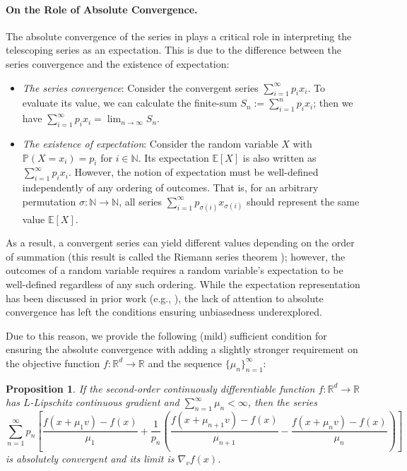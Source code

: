 \documentclass{article}
\newcommand{\EE}{\mathbb{E}}
\newcommand{\PP}{\mathbb{P}}
\newcommand{\RR}{\mathbb{R}}
\newcommand{\NN}{\mathbb{N}}
\theoremstyle{definition}
\theoremstyle{plain}
\newtheorem{proposition}[definition]{Proposition}
\theoremstyle{remark}
\begin{document}
\paragraph{On the Role of Absolute Convergence.}
The absolute convergence of the series in  plays a critical role in interpreting the telescoping series as an expectation. This is due to the difference between the series convergence and the existence of expectation:  
\begin{itemize}
    \item \textit{The series convergence}: Consider the convergent series $\sum_{i=1}^\infty p_i x_i$. To evaluate its value, we can calculate the finite-sum $S_n:=\sum_{i=1}^n p_i x_i$; then we have $\sum_{i=1}^\infty p_i x_i= \lim_{n\to \infty} S_n$.
    \item \textit{The existence of expectation}:  Consider the random variable $X$ with $\PP(X=x_i)=p_i$ for $i \in \NN$. Its expectation $\EE[X]$ is also written as $\sum_{i=1}^\infty p_i x_i$. However, the notion of expectation must be well-defined independently of any ordering of outcomes. That is, for an arbitrary permutation $\sigma: \NN \to \NN$, all series $\sum_{i=1}^\infty p_{\sigma(i)} x_{\sigma(i)}$ should represent the same value $\EE[X]$.
\end{itemize}
As a result, a convergent series can yield different values depending on the order of summation (this result is called the Riemann series theorem \citep{riemann1868darstellbarkeit,spivak2008calculus}); however, the outcomes of a random variable requires a random variable's expectation to be well-defined regardless of any such ordering. While the expectation representation has been discussed in prior work (e.g., \citep{chen2020unbiased}), the lack of attention to absolute convergence has left the conditions ensuring unbiasedness underexplored. 

Due to this reason, we provide the following (mild) sufficient condition for ensuring the absolute convergence with adding a slightly stronger requirement on the objective function $f:\RR^d \to \RR$ and the sequence $\{ \mu_n\}_{n=1}^\infty$:
\begin{proposition}\label{prop:abs-conv}
    If the second-order continuously differentiable function $f:\RR^d \to \RR$ has $L$-Lipschitz continuous gradient and $\sum_{n=1}^\infty \mu_n < \infty$, then the series $$\sum_{n=1}^\infty p_n\left[\frac{f(x+\mu_1 v) - f(x)}{\mu_1} + \frac{1}{p_n}\left( \frac{f(x+\mu_{n+1} v) - f(x)}{\mu_{n+1}} - \frac{f(x+\mu_n v) - f(x)}{\mu_n}\right) \right]$$ is absolutely convergent and its limit is $\nabla_v f(x)$.
\end{proposition}
\end{document}
